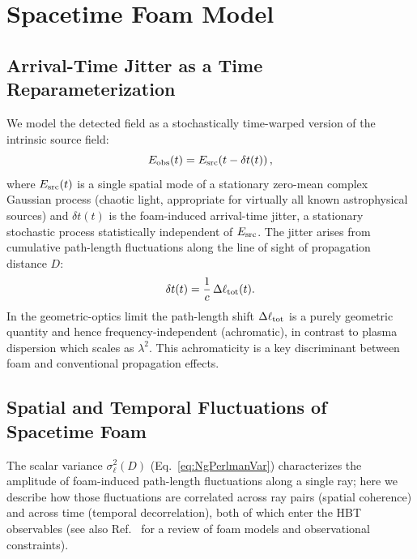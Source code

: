 \documentclass[aps,prd,onecolumn,amsmath,amssymb]{revtex4-2}
\begin{document}
\section{Spacetime Foam Model}
\label{sec:model}

\subsection{Arrival-Time Jitter as a Time Reparameterization}

We model the detected field as a stochastically time-warped version of the
intrinsic source field:
\begin{equation}
  E_{\rm obs}(t) = E_{\rm src}\!\left(t - \delta t(t)\right),
  \label{eq:Eobs}
\end{equation}
where $E_{\rm src}(t)$ is a single spatial mode of a stationary zero-mean
complex Gaussian process (chaotic light, appropriate for virtually all known
astrophysical sources) and $\delta t(t)$ is the foam-induced
arrival-time jitter, a stationary stochastic process statistically independent
of $E_{\rm src}$.
The jitter arises from cumulative path-length fluctuations along the
line of sight of propagation distance $D$:
\begin{equation}
  \delta t(t) = \frac{1}{c}\,\Delta\ell_{\rm tot}(t).
  \label{eq:jitter}
\end{equation}
In the geometric-optics limit the path-length shift $\Delta\ell_{\rm tot}$
is a purely geometric quantity and hence frequency-independent (achromatic),
in contrast to plasma dispersion which scales as $\lambda^2$.
This achromaticity is a key discriminant between foam and conventional
propagation effects.

\subsection{Spatial and Temporal Fluctuations of Spacetime Foam}
\label{sec:Calpha_origin}

The scalar variance $\sigma_\ell^2(D)$ (Eq.~\eqref{eq:NgPerlmanVar})
characterizes the amplitude of foam-induced path-length fluctuations along
a single ray; here we describe how those fluctuations are correlated across
ray pairs (spatial coherence) and across time (temporal decorrelation),
both of which enter the HBT observables (see also Ref.~\cite{Carlip2023}
for a review of foam models and observational constraints).
\end{document}
